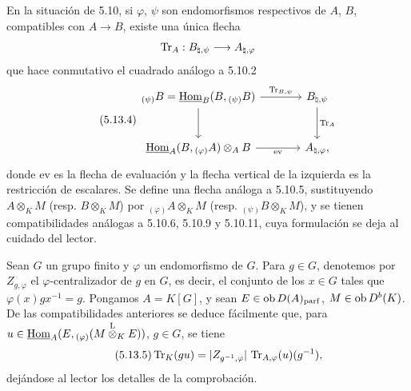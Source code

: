 En la situación de 5.10, si $\varphi$, $\psi$ son endomorfismos respectivos de $A$, $B$, compatibles con $A\to B$, existe una única flecha
\[
\operatorname{Tr}_A:B_{\natural,\psi}\longrightarrow A_{\natural,\varphi}
\]
que hace conmutativo el cuadrado análogo a 5.10.2
\begin{equation}\tag{5.13.4}
\begin{tikzcd}[column sep=large,row sep=large]
{}_{(\psi)}B=\uHom_B(B,{}_{(\psi)}B) \arrow[r,"\Tr_{B,\psi}"] \arrow[d] & B_{\natural,\psi} \arrow[d,"\Tr_A"]\\
\uHom_A(B,{}_{(\varphi)}A)\otimes_AB \arrow[r,"\mathrm{ev}"'] & A_{\natural,\varphi},
\end{tikzcd}
\end{equation}
donde $\mathrm{ev}$ es la flecha de evaluación y la flecha vertical de la izquierda es la restricción de escalares. Se define una flecha análoga a 5.10.5, sustituyendo $A\otimes_KM$ (resp. $B\otimes_KM$) por ${}_{(\varphi)}A\otimes_KM$ (resp. ${}_{(\psi)}B\otimes_KM$), y se tienen compatibilidades análogas a 5.10.6, 5.10.9 y 5.10.11, cuya formulación se deja al cuidado del lector.

Sean $G$ un grupo finito y $\varphi$ un endomorfismo de $G$. Para $g\in G$, denotemos por $Z_{g,\varphi}$ el $\varphi$-centralizador de $g$ en $G$, es decir, el conjunto de los $x\in G$ tales que $\varphi(x)gx^{-1}=g$. Pongamos $A=K[G]$, y sean $E\in\operatorname{ob} D(A)_{\mathrm{parf}}$, $M\in\operatorname{ob} D^b(K)$. De las compatibilidades anteriores se deduce fácilmente que, para $u\in\underline{\operatorname{Hom}}_A(E,{}_{(\varphi)}(M\overset{\mathrm L}{\otimes}_KE))$, $g\in G$, se tiene
\begin{equation}\tag{5.13.5}
\operatorname{Tr}_K(gu)=|Z_{g^{-1},\varphi}|\,\operatorname{Tr}_{A,\varphi}(u)(g^{-1}),
\end{equation}
dejándose al lector los detalles de la comprobación.
